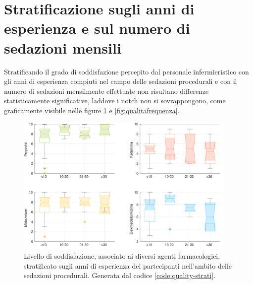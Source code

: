 \vfill

\section{Stratificazione sugli anni di esperienza e sul numero di sedazioni mensili}

Stratificando il grado di soddisfazione percepito dal personale infermieristico con gli anni di esperienza compiuti nel campo delle sedazioni procedurali e con il numero di sedazioni mensilmente effettuate non risultano differenze statisticamente significative, laddove i notch non si sovrappongono, come graficamente visibile nelle figure \ref{fig:qualitaesperienza} e \ref {fig:qualitafrequenza}.

\newpage
\vfill
\begin{figure}[ht]
    \centering
    \includegraphics[width=0.95\textwidth]{Figure/qualita-strat-esperienza.pdf}
    \caption{Livello di soddisfazione, associato ai diversi agenti farmacologici, stratificato sugli anni di esperienza dei partecipanti nell'ambito delle sedazioni procedurali. Generata dal codice \ref{code:quality-strati}.}
    \label{fig:qualitaesperienza}
\end{figure}

